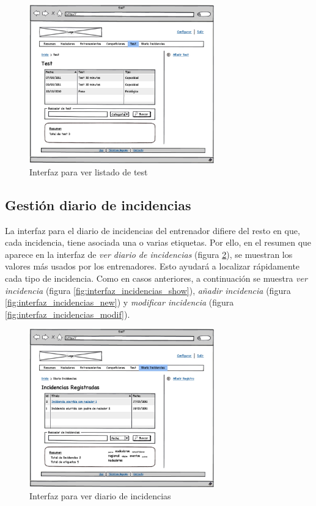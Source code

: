 		\begin{figure}[H]
		  \centering
		    \includegraphics[width=8cm]{./eps/26_Test.eps}
		  \caption{Interfaz para ver listado de test}
		  \label{fig:interfaz_test}
		\end{figure}
	
	\subsection{Gestión diario de incidencias} %
		\label{sub:interfaz_gestion_diario_de_incidencias}
	
	La interfaz para el diario de incidencias del entrenador difiere del resto en que, cada incidencia, tiene asociada una o varias etiquetas. Por ello, en el resumen que aparece en la interfaz de {\it ver diario de incidencias} (figura \ref{fig:interfaz_incidencias}), se muestran los valores más usados por los entrenadores. Esto ayudará a localizar rápidamente cada tipo de incidencia. Como en casos anteriores, a continuación se muestra {\it ver incidencia} (figura \ref{fig:interfaz_incidencias_show}), {\it añadir incidencia} (figura \ref{fig:interfaz_incidencias_new}) y {\it modificar incidencia} (figura \ref{fig:interfaz_incidencias_modif}).
	
		\begin{figure}[H]
		  \centering
		    \includegraphics[width=8cm]{./eps/22_Diario.eps}
		  \caption{Interfaz para ver diario de incidencias}
		  \label{fig:interfaz_incidencias}
		\end{figure}

